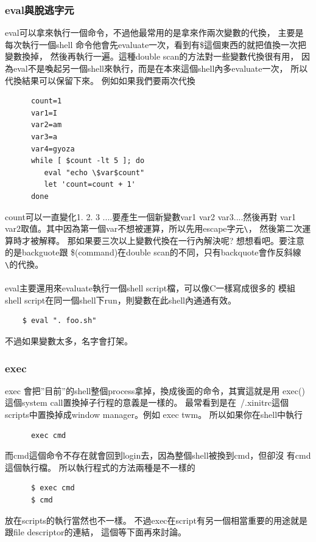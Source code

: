     \subsubsection{eval與脫逃字元}
    eval可以拿來執行一個命令，不過他最常用的是拿來作兩次變數的代換，
    主要是每次執行一個shell
    命令他會先evaluate一次，看到有\$這個東西的就把值換一次把變數換掉，
    然後再執行一遍。這種double scan的方法對一些變數代換很有用，
    因為eval不是喚起另一個shell來執行，而是在本來這個shell內多evaluate一次，
    所以代換結果可以保留下來。
    例如如果我們要兩次代換
    \begin{verbatim}
      count=1
      var1=I
      var2=am
      var3=a
      var4=gyoza
      while [ $count -lt 5 ]; do 
         eval "echo \$var$count"
         let 'count=count + 1'
      done
    \end{verbatim}
    count可以一直變化1. 2. 3 ....要產生一個新變數var1 var2 var3....然後再對
    var1 var2取值。其中因為第一個var不想被運算，所以先用escape字元\verb=\=，
    然後第二次運算時才被解釋。
    那如果要三次以上變數代換在一行內解決呢? 想想看吧。要注意的是backguote跟
    \$(command)在double scan的不同，只有backquote會作反斜線\verb=\=的代換。
    \\\\
    eval主要還用來evaluate執行一個shell script檔，可以像C一樣寫成很多的
    模組shell script在同一個shell下run，則變數在此shell內通通有效。
    \begin{verbatim}
    $ eval ". foo.sh"
    \end{verbatim}
    不過如果變數太多，名字會打架。
    \subsubsection{exec}
    exec 會把''目前''的shell整個process拿掉，換成後面的命令，其實這就是用
    exec()這個system call置換掉子行程的意義是一樣的。
    最常看到是在~/.xinitrc這個scripts中置換掉成window manager。例如
    exec twm。
    所以如果你在shell中執行
    \begin{verbatim}
      exec cmd
    \end{verbatim}
    而cmd這個命令不存在就會回到login去，因為整個shell被換到cmd，但卻沒
    有cmd這個執行檔。
    所以執行程式的方法兩種是不一樣的
    \begin{verbatim}
      $ exec cmd
      $ cmd
    \end{verbatim}
    放在scripts的執行當然也不一樣。
    不過exec在script有另一個相當重要的用途就是跟file descriptor的連結，
    這個等下面再來討論。
